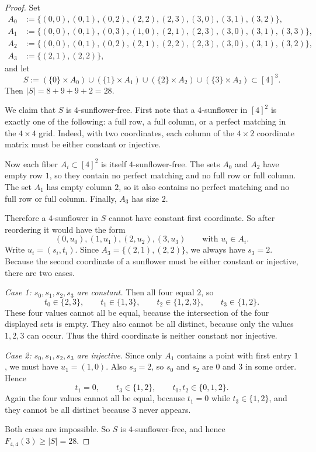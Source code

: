 \documentclass[11pt]{article}
\theoremstyle{definition}
\newcommand{\1}{\mathbf{1}}
\begin{document}
\begin{proof}
Set
\[
\begin{aligned}
A_0&:=\{(0,0),(0,1),(0,2),(2,2),(2,3),(3,0),(3,1),(3,2)\},\\
A_1&:=\{(0,0),(0,1),(0,3),(1,0),(2,1),(2,3),(3,0),(3,1),(3,3)\},\\
A_2&:=\{(0,0),(0,1),(0,2),(2,1),(2,2),(2,3),(3,0),(3,1),(3,2)\},\\
A_3&:=\{(2,1),(2,2)\},
\end{aligned}
\]
and let
\[
S:=(\{0\}\times A_0)\cup(\{1\}\times A_1)\cup(\{2\}\times A_2)\cup(\{3\}\times A_3)\subset [4]^3.
\]
Then $|S|=8+9+9+2=28$.

We claim that $S$ is $4$-sunflower-free. First note that a $4$-sunflower in $[4]^2$ is exactly one of the following: a full row, a full column, or a perfect matching in the $4\times 4$ grid. Indeed, with two coordinates, each column of the $4\times 2$ coordinate matrix must be either constant or injective.

Now each fiber $A_i\subset [4]^2$ is itself $4$-sunflower-free. The sets $A_0$ and $A_2$ have empty row $1$, so they contain no perfect matching and no full row or full column. The set $A_1$ has empty column $2$, so it also contains no perfect matching and no full row or full column. Finally, $A_3$ has size $2$.

Therefore a $4$-sunflower in $S$ cannot have constant first coordinate. So after reordering it would have the form
\[
(0,u_0),(1,u_1),(2,u_2),(3,u_3)
\qquad\text{with }u_i\in A_i.
\]
Write $u_i=(s_i,t_i)$. Since $A_3=\{(2,1),(2,2)\}$, we always have $s_3=2$. Because the second coordinate of a sunflower must be either constant or injective, there are two cases.

\emph{Case 1: $s_0,s_1,s_2,s_3$ are constant.}
Then all four equal $2$, so
\[
t_0\in\{2,3\},\qquad
 t_1\in\{1,3\},\qquad
 t_2\in\{1,2,3\},\qquad
 t_3\in\{1,2\}.
\]
These four values cannot all be equal, because the intersection of the four displayed sets is empty. They also cannot be all distinct, because only the values $1,2,3$ can occur. Thus the third coordinate is neither constant nor injective.

\emph{Case 2: $s_0,s_1,s_2,s_3$ are injective.}
Since only $A_1$ contains a point with first entry $1$, we must have $u_1=(1,0)$. Also $s_3=2$, so $s_0$ and $s_2$ are $0$ and $3$ in some order. Hence
\[
t_1=0,
\qquad t_3\in\{1,2\},
\qquad t_0,t_2\in\{0,1,2\}.
\]
Again the four values cannot all be equal, because $t_1=0$ while $t_3\in\{1,2\}$, and they cannot be all distinct because $3$ never appears.

Both cases are impossible. So $S$ is $4$-sunflower-free, and hence $F_{4,4}(3)\ge |S|=28$.
\end{proof}
\end{document}
